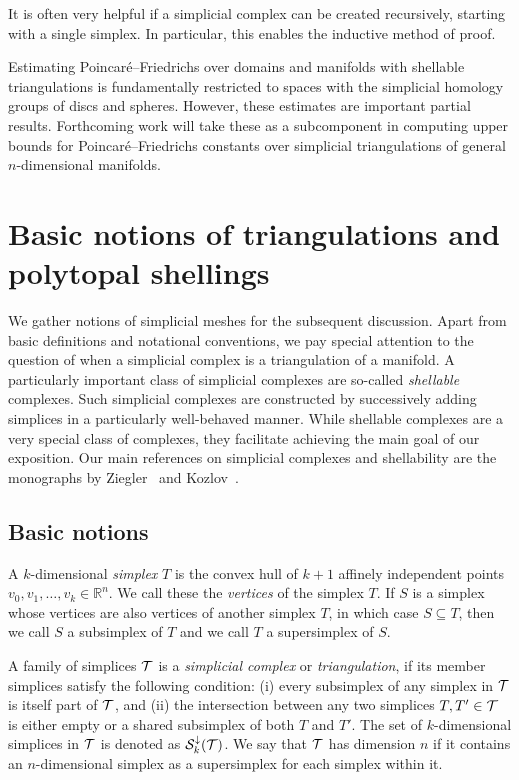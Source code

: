\documentclass[a4paper]{amsart}
\begin{document}
It is often very helpful if a simplicial complex can be created recursively, starting with a single simplex. 
In particular, this enables the inductive method of proof.


Estimating Poincar\'e--Friedrichs over domains and manifolds with shellable triangulations is fundamentally restricted to spaces with the simplicial homology groups of discs and spheres. However, these estimates are important partial results. Forthcoming work will take these as a subcomponent in computing upper bounds for Poincar\'e--Friedrichs constants over simplicial triangulations of general $n$-dimensional manifolds. 



\section{Basic notions of triangulations and polytopal shellings}

We gather notions of simplicial meshes for the subsequent discussion. 
Apart from basic definitions and notational conventions, we pay special attention to the question of when a simplicial complex is a triangulation of a manifold. 
A particularly important class of simplicial complexes are so-called \emph{shellable} complexes. Such simplicial complexes are constructed by successively adding simplices in a particularly well-behaved manner. While shellable complexes are a very special class of complexes, they facilitate achieving the main goal of our exposition.
Our main references on simplicial complexes and shellability are the monographs by Ziegler~\cite{ziegler2012lectures} and Kozlov~\cite{kozlov2008combinatorial}. 


\subsection{Basic notions}

A ${k}$-dimensional \emph{simplex} $T$ is the convex hull of ${k}+1$ affinely independent points $v_0, v_1, \ldots, v_{{k}} \in \mathbb{R}^{n}$. We call these the \emph{vertices} of the simplex $T$. 
If $S$ is a simplex whose vertices are also vertices of another simplex $T$, in which case $S \subseteq T$, 
then we call $S$ a subsimplex of $T$ and we call $T$ a supersimplex of $S$. 

A family of simplices ${\mathcal T}$ is a \emph{simplicial complex} or \emph{triangulation}, if its member simplices satisfy the following condition: 
(i) every subsimplex of any simplex in ${\mathcal T}$ is itself part of ${\mathcal T}$, and (ii) the intersection between any two simplices $T, T' \in {\mathcal T}$ is either empty or a shared subsimplex of both $T$ and $T'$. 
The set of $k$-dimensional simplices in ${\mathcal T}$ is denoted as ${\mathcal S}^{\downarrow}_{{k}}({\mathcal T})$. 
We say that ${\mathcal T}$ has dimension $n$ if it contains an $n$-dimensional simplex as a supersimplex for each simplex within it. 
\end{document}
